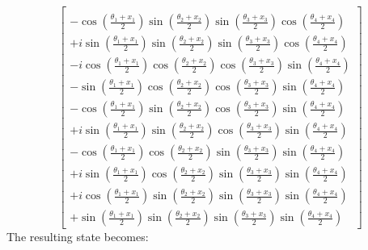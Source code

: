 \documentclass[12pt]{article}
\numberwithin{equation}{section}  %
\theoremstyle{definition}
\theoremstyle{plain}
\theoremstyle{remark}
\begin{document}
\begin{equation*}
\begin{bmatrix}
\\[6pt]
-\cos\left(\frac{\theta_1+x_1}{2}\right)
\sin\left(\frac{\theta_2+x_2}{2}\right)
\sin\left(\frac{\theta_3+x_3}{2}\right)
\cos\left(\frac{\theta_4+x_4}{2}\right)
\\[6pt]
+i\sin\left(\frac{\theta_1+x_1}{2}\right)
\sin\left(\frac{\theta_2+x_2}{2}\right)
\sin\left(\frac{\theta_3+x_3}{2}\right)
\cos\left(\frac{\theta_4+x_4}{2}\right)
\\[6pt]
-i\cos\left(\frac{\theta_1+x_1}{2}\right)
\cos\left(\frac{\theta_2+x_2}{2}\right)
\cos\left(\frac{\theta_3+x_3}{2}\right)
\sin\left(\frac{\theta_4+x_4}{2}\right)
\\[6pt]
-\sin\left(\frac{\theta_1+x_1}{2}\right)
\cos\left(\frac{\theta_2+x_2}{2}\right)
\cos\left(\frac{\theta_3+x_3}{2}\right)
\sin\left(\frac{\theta_4+x_4}{2}\right)
\\[6pt]
-\cos\left(\frac{\theta_1+x_1}{2}\right)
\sin\left(\frac{\theta_2+x_2}{2}\right)
\cos\left(\frac{\theta_3+x_3}{2}\right)
\sin\left(\frac{\theta_4+x_4}{2}\right)
\\[6pt]
+i\sin\left(\frac{\theta_1+x_1}{2}\right)
\sin\left(\frac{\theta_2+x_2}{2}\right)
\cos\left(\frac{\theta_3+x_3}{2}\right)
\sin\left(\frac{\theta_4+x_4}{2}\right)
\\[6pt]
-\cos\left(\frac{\theta_1+x_1}{2}\right)
\cos\left(\frac{\theta_2+x_2}{2}\right)
\sin\left(\frac{\theta_3+x_3}{2}\right)
\sin\left(\frac{\theta_4+x_4}{2}\right)
\\[6pt]
+i\sin\left(\frac{\theta_1+x_1}{2}\right)
\cos\left(\frac{\theta_2+x_2}{2}\right)
\sin\left(\frac{\theta_3+x_3}{2}\right)
\sin\left(\frac{\theta_4+x_4}{2}\right)
\\[6pt]
+i\cos\left(\frac{\theta_1+x_1}{2}\right)
\sin\left(\frac{\theta_2+x_2}{2}\right)
\sin\left(\frac{\theta_3+x_3}{2}\right)
\sin\left(\frac{\theta_4+x_4}{2}\right)
\\[6pt]
+\sin\left(\frac{\theta_1+x_1}{2}\right)
\sin\left(\frac{\theta_2+x_2}{2}\right)
\sin\left(\frac{\theta_3+x_3}{2}\right)
\sin\left(\frac{\theta_4+x_4}{2}\right)
\end{bmatrix}
\end{equation*}
\endgroup
The resulting state becomes:
\end{document}
